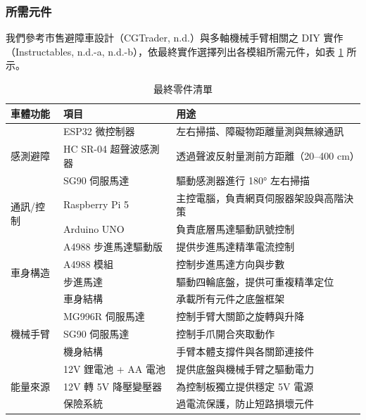 \documentclass[12pt]{article}
\begin{document}
\subsubsection{所需元件}

我們參考市售避障車設計（CGTrader, n.d.）與多軸機械手臂相關之 DIY 實作（Instructables, n.d.-a, n.d.-b），依最終實作選擇列出各模組所需元件，如表 \ref{tab:materials} 所示。

\begin{table}[H]
    \centering
    \caption{最終零件清單}
    \label{tab:materials}
    \scriptsize
    \setlength{\tabcolsep}{3pt}
    \renewcommand{\arraystretch}{0.95}
    \begin{tabularx}{\linewidth}{l X X}
      \toprule
      車體功能 & 項目 & 用途 \\
      \midrule
      \multirow{3}{*}{感測避障}
        & ESP32 微控制器              & 左右掃描、障礙物距離量測與無線通訊 \\
        & HC SR-04 超聲波感測器       & 透過聲波反射量測前方距離（20--400 cm）\\
        & SG90 伺服馬達               & 驅動感測器進行 180° 左右掃描 \\
      \midrule
      \multirow{2}{*}{通訊/控制}
        & Raspberry Pi 5            & 主控電腦，負責網頁伺服器架設與高階決策 \\
        & Arduino UNO               & 負責底層馬達驅動訊號控制 \\
      \midrule
      \multirow{4}{*}{車身構造}
        & A4988 步進馬達驅動版         & 提供步進馬達精準電流控制 \\
        & A4988 模組                  & 控制步進馬達方向與步數 \\
        & 步進馬達                    & 驅動四輪底盤，提供可重複精準定位 \\
        & 車身結構                    & 承載所有元件之底盤框架 \\
      \midrule
      \multirow{3}{*}{機械手臂}
        & MG996R 伺服馬達             & 控制手臂大關節之旋轉與升降 \\
        & SG90 伺服馬達               & 控制手爪開合夾取動作 \\
        & 機身結構                    & 手臂本體支撐件與各關節連接件 \\
      \midrule
      \multirow{3}{*}{能量來源}
        & 12V 鋰電池 + AA 電池        & 提供底盤與機械手臂之驅動電力 \\
        & 12V 轉 5V 降壓變壓器        & 為控制板獨立提供穩定 5V 電源 \\
        & 保險系統                    & 過電流保護，防止短路損壞元件 \\
    \bottomrule
    \end{tabularx}
  \end{table}
\end{document}
